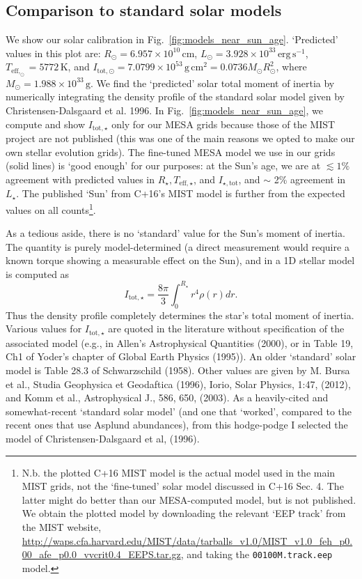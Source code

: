 \documentclass{article}
\begin{document}
\subsection{Comparison to standard solar models}
\label{sec:solar_calibration}
We show our solar calibration in Fig.~\ref{fig:models_near_sun_age}.
`Predicted' values in this plot are: $R_\odot = 
6.957\times10^{10}\,\mathrm{cm}$, $L_\odot = 
3.928\times10^{33}\,\mathrm{erg\,s^{-1}}$, $T_\mathrm{eff,_\odot} = 
5772\,\mathrm{K}$, and $I_\mathrm{tot,\odot} = 
7.0799\times10^{53}\,\mathrm{g\,cm^2} = 
0.0736 M_\odot R_\odot^2$, where $M_\odot = 1.988\times10^{33}\,\mathrm{g}$.
We find the `predicted' solar total moment of inertia by numerically 
integrating the density profile of the standard solar model given by 
Christensen-Dalsgaard et al. 1996.
In Fig.~\ref{fig:models_near_sun_age}, we compute and show 
$I_\mathrm{tot,\star}$ only for our MESA grids because those of the MIST 
project are not published (this was one of the main reasons we opted to make 
our own stellar evolution grids).
The fine-tuned MESA model we use in our grids (solid lines) is `good enough' 
for our purposes: at the Sun's age, we are at $\lesssim 1\%$ agreement with 
predicted values in $R_\star, T_\mathrm{eff,\star}$, and 
$I_\mathrm{\star,tot}$, and $\sim$ 2\% agreement in $L_\star$.
The published `Sun' from C+16's MIST model is further from the expected values 
on all counts\footnote{N.b. the plotted C+16 MIST model is the actual model 
used in the main MIST grids, not the `fine-tuned' solar model discussed in C+16 
Sec. 4. The latter might do better than our MESA-computed model, but is not 
published. We obtain the plotted model by downloading the relevant `EEP track' 
from the 
MIST website, 
\url{http://waps.cfa.harvard.edu/MIST/data/tarballs_v1.0/MIST_v1.0_feh_p0.00_afe_p0.0_vvcrit0.4_EEPS.tar.gz},
and taking the \texttt{00100M.track.eep} model.}.

As a tedious aside, there is no `standard' value for the Sun's moment of 
inertia. The quantity is purely model-determined (a direct measurement would 
require a known torque showing a measurable effect on the Sun), and in a 1D 
stellar model is computed as 
\begin{equation}
I_{\mathrm{tot,\star}} = \frac{8\pi}{3} \int_0^{R_\star} r^4 \rho(r) dr.
\end{equation}
Thus the density profile completely determines the star's total moment of 
inertia. Various values for $I_\mathrm{tot,\star}$ are quoted in the 
literature without specification of the associated model (e.g., in Allen's 
Astrophysical Quantities (2000), or in Table 19, Ch1 of Yoder's chapter of 
Global Earth Physics (1995)). An older `standard' solar model is Table 28.3 of 
Schwarzschild (1958). Other values are given by M. Bursa et al., Studia 
Geophysica et Geodaftica (1996), Iorio, Solar Physics, 1:47, (2012), and Komm 
et al., Astrophysical J., 586, 650, (2003).
As a heavily-cited and somewhat-recent `standard solar model' (and one that 
`worked', compared to the recent ones that use Asplund abundances), from this 
hodge-podge I selected the model of Christensen-Dalsgaard et al, (1996). 
\end{document}
